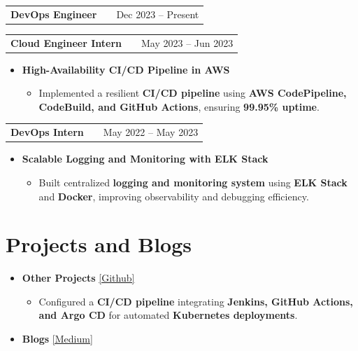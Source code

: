 \documentclass[a4paper,10.999999pt]{article}
\makeatletter
\newenvironment{joblong}[2]
        {
        \begin{tabularx}{\linewidth}{@{}l X r@{}}
        \textbf{#1} & \hfill &  #2 \\[-1pt]
        \end{tabularx}
        \vspace{-3.2pt}
        \begin{minipage}[t]{\linewidth}
        \begin{itemize}[nosep, after=\strut, leftmargin=0.5em, itemsep=1pt, label=\raisebox{0.2ex}{\tiny$\circ$}]
        }
        {
        \end{itemize}
        \end{minipage}
        \vspace{-3.2pt}
        }
\makeatother
\begin{document}
\begin{joblong}{DevOps Engineer}{Dec 2023 -- Present}
    \end{joblong}

    \begin{joblong}{Cloud Engineer Intern}{May 2023 -- Jun 2023}
    Mactores Innovation
    \item \textbf{High-Availability CI/CD Pipeline in AWS}
    \begin{itemize}[nosep, leftmargin=1.5em, itemsep=1pt, label=\raisebox{0.25ex}{\small$-$}]
    \item Implemented a resilient \textbf{CI/CD pipeline} using \textbf{AWS CodePipeline, CodeBuild, and GitHub Actions}, ensuring \textbf{99.95\% uptime}.
    \end{itemize}
    \end{joblong}

    \begin{joblong}{DevOps Intern}{May 2022 -- May 2023}
    Motorola Solutions
    \item \textbf{Scalable Logging and Monitoring with ELK Stack}
    \begin{itemize}[nosep, leftmargin=1.5em, itemsep=1pt, label=\raisebox{0.25ex}{\small$-$}]
    \item Built centralized \textbf{logging and monitoring system} using \textbf{ELK Stack} and \textbf{Docker}, improving observability and debugging efficiency.
    \end{itemize}
    \end{joblong}


    \section{Projects and Blogs}

    \begin{itemize}[leftmargin=1.5em, itemsep=2pt, label=\raisebox{0.25ex}{\tiny$\circ$}]
    \item \textbf{Other Projects} \href{https://github.com/KelviManavadaria-17}{[Github]}
    \begin{itemize}[nosep, leftmargin=1.5em, itemsep=1pt, label=\raisebox{0.25ex}{\small$-$}]
    \item Configured a \textbf{CI/CD pipeline} integrating \textbf{Jenkins, GitHub Actions, and Argo CD} for automated \textbf{Kubernetes deployments}.
    \end{itemize}
    \item \textbf{Blogs} \href{https://medium.com/@KelviManavadaria}{[Medium]}
    \end{itemize}
\end{document}
